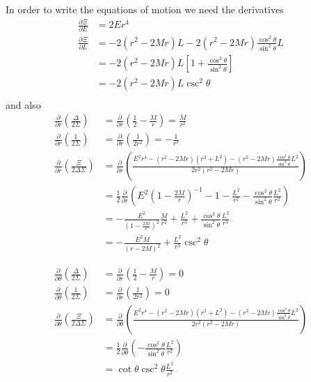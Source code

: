 In order to write the equations of motion we need the derivatives
\begin{align}
\frac{\partial \Xi}{\partial E} &= 2E r^4 \\
\frac{\partial \Xi}{\partial L} &= - 2(r^2 -2Mr)L - 2(r^2 -2Mr) \frac{\cos^2 \theta}{\sin^2 \theta}L \nonumber \\
						&= - 2(r^2 -2Mr)L \left[1 +  \frac{\cos^2 \theta}{\sin^2 \theta} \right] \nonumber \\
						&= - 2(r^2 -2Mr)L \csc^2 \theta  \\
\end{align}
and also
\begin{align}
\frac{\partial}{\partial r}\left( \frac{\Delta}{2\Sigma}\right) &= \frac{\partial}{\partial r}\left( \frac{1}{2} - \frac{M}{r} \right) = \frac{M}{r^2} \\
\frac{\partial}{\partial r}\left( \frac{1}{2\Sigma}\right) &= \frac{\partial}{\partial r}\left( \frac{1}{2r^2}\right) = -\frac{1}{r^3}\\
\frac{\partial}{\partial r}\left( \frac{\Xi}{2\Delta \Sigma}\right) &= \frac{\partial}{\partial r}\left( \frac{E^2 r^4 - (r^2 -2Mr) ( r^2 + L^2 ) - (r^2 -2Mr) \frac{\cos^2 \theta}{\sin^2 \theta}L^2}{2r^2(r^2 -2Mr)}\right) \nonumber \\
&= \frac{1}{2} \frac{\partial}{\partial r}\left( E^2\left(1-\frac{2M}{r}\right)^{-1} - 1 - \frac{L^2}{r^2} - \frac{\cos^2 \theta}{\sin^2 \theta} \frac{L^2}{r^2} \right) \nonumber \\
&= -\frac{E^2}{\left(1-\frac{2M}{r}\right)^2}\frac{M}{r^2}  + \frac{L^2}{r^3} + \frac{\cos^2 \theta}{\sin^2 \theta} \frac{L^2}{r^3} \nonumber \\
&= -\frac{E^2 M}{(r-2M)^2}  + \frac{L^2}{r^3} \csc^2 \theta
\end{align}

\begin{align}
\frac{\partial}{\partial \theta}\left( \frac{\Delta}{2\Sigma}\right) &= \frac{\partial}{\partial r}\left( \frac{1}{2} - \frac{M}{r} \right) = 0 \\
\frac{\partial}{\partial \theta}\left( \frac{1}{2\Sigma}\right) &= \frac{\partial}{\partial r}\left( \frac{1}{2r^2}\right) = 0\\
\frac{\partial}{\partial \theta}\left( \frac{\Xi}{2\Delta \Sigma}\right) &= \frac{\partial}{\partial \theta}\left( \frac{E^2 r^4 - (r^2 -2Mr) ( r^2 + L^2 ) - (r^2 -2Mr) \frac{\cos^2 \theta}{\sin^2 \theta}L^2}{2r^2(r^2 -2Mr)}\right) \nonumber \\
&= \frac{1}{2} \frac{\partial}{\partial \theta}\left( -  \frac{\cos^2 \theta}{\sin^2 \theta} \frac{L^2}{r^2}\right) \nonumber \\
&= \cot \theta \csc^2 \theta \frac{L^2}{r^2} 
\end{align}

